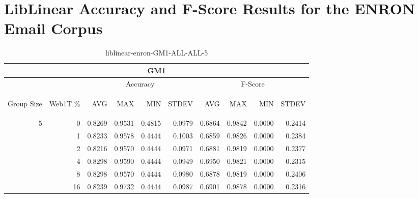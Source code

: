 \chapter{LibLinear Accuracy and F-Score Results for the ENRON Email Corpus}

\begin{center}
\begin{table}[htbp] 
 \begin{center}
\begin{tabular}{ | r | r | r | r | r | r | r | r | r | r |}
\hline
\multicolumn{10}{|c|}{GM1}\\
\hline
 & & \multicolumn{4}{|c|}{Accuracy} & \multicolumn{4}{|c|}{F-Score}\\ \cline{3-10}
\begin{sideways}Group Size\end{sideways} & \begin{sideways}Web1T \%\end{sideways} & \begin{sideways}AVG\end{sideways} & \begin{sideways}MAX\end{sideways} & \begin{sideways}MIN\end{sideways} & \begin{sideways}STDEV\end{sideways} & \begin{sideways}AVG\end{sideways} & \begin{sideways}MAX\end{sideways} & \begin{sideways}MIN\end{sideways} & \begin{sideways}STDEV\end{sideways}\\
\hline
\multirow{5}{*}{5}
 & 0 & 0.8269 & 0.9531 & 0.4815 & 0.0979 & 0.6864 & 0.9842 & 0.0000 & 0.2414\\ \cline{2-10}
 & 1 & 0.8233 & 0.9578 & 0.4444 & 0.1003 & 0.6859 & 0.9826 & 0.0000 & 0.2384\\ \cline{2-10}
 & 2 & 0.8216 & 0.9570 & 0.4444 & 0.0971 & 0.6881 & 0.9819 & 0.0000 & 0.2377\\ \cline{2-10}
 & 4 & 0.8298 & 0.9590 & 0.4444 & 0.0949 & 0.6950 & 0.9821 & 0.0000 & 0.2315\\ \cline{2-10}
 & 8 & 0.8298 & 0.9570 & 0.4444 & 0.0980 & 0.6878 & 0.9819 & 0.0000 & 0.2406\\ \cline{2-10}
 & 16 & 0.8239 & 0.9732 & 0.4444 & 0.0987 & 0.6901 & 0.9878 & 0.0000 & 0.2316\\ \cline{2-10}
\hline
\end{tabular}
\caption{liblinear-enron-GM1-ALL-ALL-5}
\label{table:liblinear-enron-GM1-ALL-ALL-5}
\end{center}
 \end{table}
\end{center}

